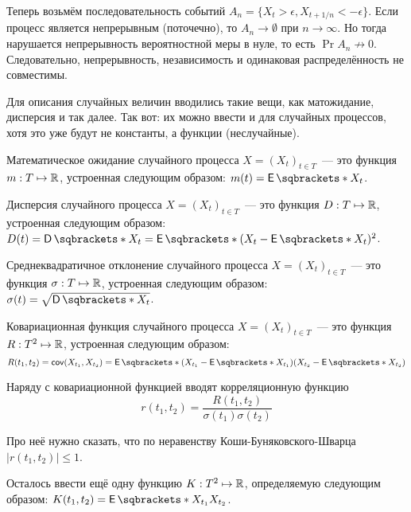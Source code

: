 Теперь возьмём последовательность событий \(A_{n} = \{X_{t} > \epsilon, X_{t + 
1/n} < -\epsilon\}\). Если процесс является непрерывным (поточечно), то \(A_n 
\to \emptyset\) при \(n \to \infty\). Но тогда нарушается непрерывность 
вероятностной меры в нуле, то есть \(\Pr{A_{n}} \not\to 0\). Следовательно, 
непрерывность, независимость и одинаковая распределённость не совместимы.

Для описания случайных величин вводились такие вещи, как матожидание, дисперсия 
и так далее. Так вот: их можно ввести и для случайных процессов, хотя это уже 
будут не константы, а функции (неслучайные).
\begin{definition}
	Математическое ожидание случайного процесса \(X = (X_{t})_{t \in T}\)~--- 
	это функция \(m : T \mapsto \mathbb{R}\), устроенная следующим образом: \(m(t) = 
	\E{X_{t}}\).
\end{definition}
\begin{definition}
	Дисперсия случайного процесса \(X = (X_{t})_{t \in T}\)~--- 
	это функция \(D : T \mapsto \mathbb{R}\), устроенная следующим образом: \(D(t) = 
	\D{X_{t}} = \E{(X_{t} - \E{X_{t}})^{2}}\).
\end{definition}
\begin{definition}
	Среднеквадратичное отклонение случайного процесса \(X = (X_{t})_{t \in 
		T}\)~--- это функция \(\sigma : T \mapsto \mathbb{R}\), устроенная следующим 
	образом: \(\sigma(t) = \sqrt{\D{X_{t}}}\).
\end{definition}
\begin{definition}
	Ковариационная функция случайного процесса \(X = (X_{t})_{t \in T}\)~--- 
	это функция \(R : T^{2} \mapsto \mathbb{R}\), устроенная следующим образом: 
	\[
	R(t_{1}, t_{2}) = \cov(X_{t_{1}}, X_{t_{2}}) = \E{(X_{t_{1}} - 
		\E{X_{t_{1}}})(X_{t_{2}} - \E{X_{t_{2}}})}
	\]
\end{definition}
Наряду с ковариационной функцией вводят корреляционную функцию
\[
r(t_{1}, t_{2}) = \frac{R(t_{1}, t_{2})}{\sigma(t_{1})\sigma(t_{2})}
\]

Про неё нужно сказать, что по неравенству Коши-Буняковского-Шварца \(|r(t_{1}, 
t_{2})| \leq 1\).

Осталось ввести ещё одну функцию \(K : T^{2} \mapsto \mathbb{R}\), определяемую 
следующим образом: \(K(t_{1}, t_{2}) = \E{X_{t_{1}}X_{t_{2}}}\).

